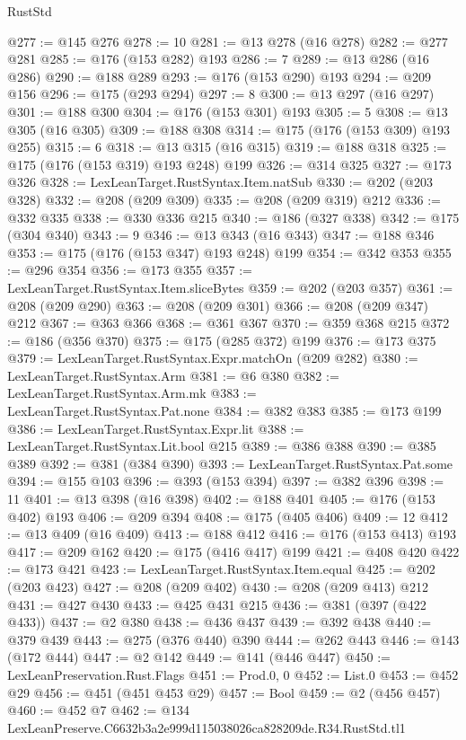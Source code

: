 \begin{lexlean}{RustStd}
\begin{coremodule}
@277 := @145 @276
@278 := 10
@281 := @13 @278 (@16 @278)
@282 := @277 @281
@285 := @176 (@153 @282) @193
@286 := 7
@289 := @13 @286 (@16 @286)
@290 := @188 @289
@293 := @176 (@153 @290) @193
@294 := @209 @156
@296 := @175 (@293 @294)
@297 := 8
@300 := @13 @297 (@16 @297)
@301 := @188 @300
@304 := @176 (@153 @301) @193
@305 := 5
@308 := @13 @305 (@16 @305)
@309 := @188 @308
@314 := @175 (@176 (@153 @309) @193 @255)
@315 := 6
@318 := @13 @315 (@16 @315)
@319 := @188 @318
@325 := @175 (@176 (@153 @319) @193 @248) @199
@326 := @314 @325
@327 := @173 @326
@328 := LexLeanTarget.RustSyntax.Item.natSub
@330 := @202 (@203 @328)
@332 := @208 (@209 @309)
@335 := @208 (@209 @319) @212
@336 := @332 @335
@338 := @330 @336 @215
@340 := @186 (@327 @338)
@342 := @175 (@304 @340)
@343 := 9
@346 := @13 @343 (@16 @343)
@347 := @188 @346
@353 := @175 (@176 (@153 @347) @193 @248) @199
@354 := @342 @353
@355 := @296 @354
@356 := @173 @355
@357 := LexLeanTarget.RustSyntax.Item.sliceBytes
@359 := @202 (@203 @357)
@361 := @208 (@209 @290)
@363 := @208 (@209 @301)
@366 := @208 (@209 @347) @212
@367 := @363 @366
@368 := @361 @367
@370 := @359 @368 @215
@372 := @186 (@356 @370)
@375 := @175 (@285 @372) @199
@376 := @173 @375
@379 := LexLeanTarget.RustSyntax.Expr.matchOn (@209 @282)
@380 := LexLeanTarget.RustSyntax.Arm
@381 := @6 @380
@382 := LexLeanTarget.RustSyntax.Arm.mk
@383 := LexLeanTarget.RustSyntax.Pat.none
@384 := @382 @383
@385 := @173 @199
@386 := LexLeanTarget.RustSyntax.Expr.lit
@388 := LexLeanTarget.RustSyntax.Lit.bool @215
@389 := @386 @388
@390 := @385 @389
@392 := @381 (@384 @390)
@393 := LexLeanTarget.RustSyntax.Pat.some
@394 := @155 @103
@396 := @393 (@153 @394)
@397 := @382 @396
@398 := 11
@401 := @13 @398 (@16 @398)
@402 := @188 @401
@405 := @176 (@153 @402) @193
@406 := @209 @394
@408 := @175 (@405 @406)
@409 := 12
@412 := @13 @409 (@16 @409)
@413 := @188 @412
@416 := @176 (@153 @413) @193
@417 := @209 @162
@420 := @175 (@416 @417) @199
@421 := @408 @420
@422 := @173 @421
@423 := LexLeanTarget.RustSyntax.Item.equal
@425 := @202 (@203 @423)
@427 := @208 (@209 @402)
@430 := @208 (@209 @413) @212
@431 := @427 @430
@433 := @425 @431 @215
@436 := @381 (@397 (@422 @433))
@437 := @2 @380
@438 := @436 @437
@439 := @392 @438
@440 := @379 @439
@443 := @275 (@376 @440) @390
@444 := @262 @443
@446 := @143 (@172 @444)
@447 := @2 @142
@449 := @141 (@446 @447)
@450 := LexLeanPreservation.Rust.Flags
@451 := Prod.{0, 0}
@452 := List.{0}
@453 := @452 @29
@456 := @451 (@451 @453 @29)
@457 := Bool
@459 := @2 (@456 @457)
@460 := @452 @7
@462 := @134 LexLeanPreserve.C6632b3a2e999d115038026ca828209de.R34.RustStd.tl1

\end{coremodule}
\end{lexlean}

